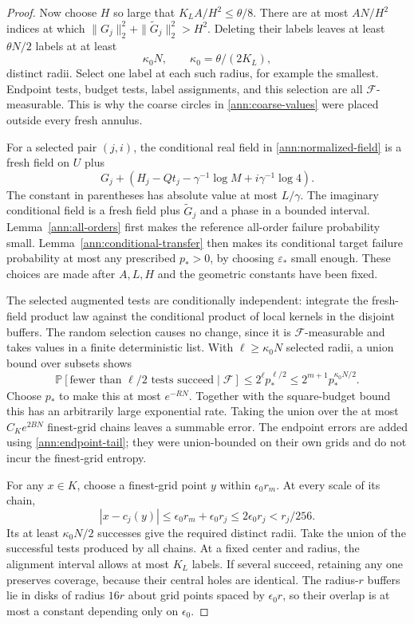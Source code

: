 \documentclass[11pt]{article}
\numberwithin{equation}{section}
\theoremstyle{definition}
\theoremstyle{remark}
\newcommand{\1}{\mathbf 1}
\begin{document}
\begin{proof}
Now choose \(H\) so large that
\(K_LA/H^2\le\theta/8\).
There are at most \(AN/H^2\) indices at which
\(\|G_j\|_2^2+\|\widetilde G_j\|_2^2>H^2\).
Deleting their labels leaves at least \(\theta N/2\) labels
at at least
\[
 \kappa_0N,\qquad \kappa_0=\theta/(2K_L),
\]
distinct radii.  Select one label at each such radius, for example
the smallest.  Endpoint tests, budget tests, label assignments, and
this selection are all \(\mathcal F\)-measurable.  This is why
the coarse circles in \eqref{ann:coarse-values} were placed outside
every fresh annulus.

For a selected pair \((j,i)\), the conditional real field in
\eqref{ann:normalized-field} is a fresh field on \(U\) plus
\[
 G_j+\left(H_j-Qt_j-\gamma^{-1}\log M
                                  +i\gamma^{-1}\log4\right).
\]
The constant in parentheses has absolute value at most \(L/\gamma\).
The imaginary conditional field is a fresh field plus
\(\widetilde G_j\) and a phase in a bounded interval.
Lemma~\ref{ann:all-orders} first makes the reference all-order
failure probability small.  Lemma~\ref{ann:conditional-transfer}
then makes its conditional target failure probability at most any
prescribed \(p_*>0\), by choosing \(\varepsilon_*\) small enough.
These choices are made after
\(A,L,H\) and the geometric constants have been fixed.

The selected augmented tests are conditionally independent:
integrate the fresh-field product law against the conditional
product of local kernels in the disjoint buffers.  The random
selection causes no change, since it is \(\mathcal F\)-measurable
and takes values in a finite deterministic list.
With \(\ell\ge\kappa_0N\) selected radii, a union bound over
subsets shows
\begin{equation}
 \mathbb P[\text{fewer than }\ell/2\text{ tests succeed}\mid\mathcal F]
 \le 2^\ell p_*^{\ell/2}
 \le 2^{m+1}p_*^{\kappa_0N/2}.
 \label{ann:bernoulli-tail}
\end{equation}
Choose \(p_*\) to make this at most \(e^{-RN}\).
Together with the square-budget bound this has an arbitrarily
large exponential rate.  Taking the union over the at most
\(C_Ke^{2BN}\) finest-grid chains leaves a summable error.
The endpoint errors are added using \eqref{ann:endpoint-tail};
they were union-bounded on their own grids and do not incur the
finest-grid entropy.

For any \(x\in K\), choose a finest-grid point \(y\) within
\(\epsilon_0r_m\).  At every scale of its chain,
\[
 |x-c_j(y)|\le\epsilon_0r_m+\epsilon_0r_j
                  \le 2\epsilon_0r_j<r_j/256.
\]
Its at least \(\kappa_0N/2\) successes give the required distinct
radii.  Take the union of the successful tests produced by all
chains.  At a fixed center and radius, the alignment interval
allows at most \(K_L\) labels.  If several succeed, retaining any
one preserves coverage, because their central holes are identical.
The radius-\(r\) buffers lie in disks of radius \(16r\) about
grid points spaced by \(\epsilon_0r\), so their overlap is at
most a constant depending only on \(\epsilon_0\).


\end{proof}
\end{document}
